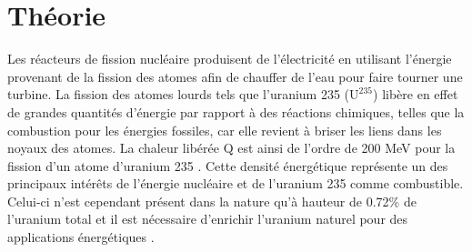 \section{Théorie}

Les réacteurs de fission nucléaire produisent de l'électricité en utilisant l'énergie provenant de la fission des atomes afin de chauffer de l'eau pour faire tourner une turbine. La fission des atomes lourds tels que l'uranium 235 ($\mathrm{U}^{235}$) libère en effet de grandes quantités d'énergie par rapport à des réactions chimiques, telles que la combustion pour les énergies fossiles, car elle revient à briser les liens dans les noyaux des atomes. La chaleur libérée $\mathrm{Q}$ est ainsi de l'ordre de 200 \si{\mega\electronvolt} pour la fission d'un atome d'uranium 235 \cite{notice}. Cette densité énergétique représente un des principaux intérêts de l'énergie nucléaire et de l'uranium 235 comme combustible. Celui-ci n'est cependant présent dans la nature qu'à hauteur de 0.72\% de l'uranium total et il est nécessaire d'enrichir l'uranium naturel pour des applications énergétiques \cite{notice}. 

